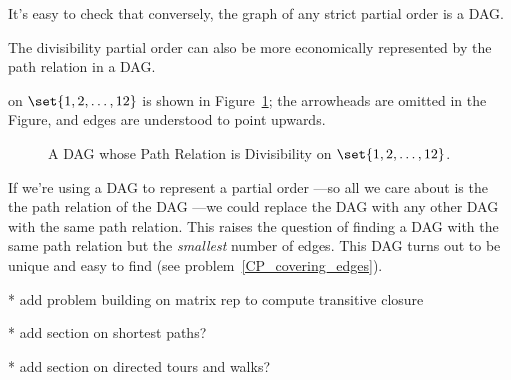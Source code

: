 It's easy to check that conversely, the graph of any strict partial
order is a DAG.

The divisibility partial order can also be more economically represented by
the path relation in a DAG.   on $\set{1,2,\dots,12}$ is shown in
Figure~\ref{fig:divisibility-DAG}; the arrowheads are omitted in the
Figure, and edges are understood to point upwards.

\begin{figure}[h]
\begin{center}

\end{center}
\caption{A DAG whose Path Relation is Divisibility on $\set{1,2,\dots,12}$.}
\label{fig:divisibility-DAG}
\end{figure}

If we're using a DAG to represent a partial order ---so all we care
about is the the path relation of the DAG ---we could replace the DAG
with any other DAG with the same path relation.  This raises the
question of finding a DAG with the same path relation but the
\emph{smallest} number of edges.  This DAG turns out to be unique and
easy to find (see problem~\ref{CP_covering_edges}).

\begin{problems}
\practiceproblems
{}

\classproblems
{}

\homeworkproblems
{}
\end{problems}

\begin{staffnotes}
* add problem building on matrix rep to compute transitive closure

* add section on shortest paths?

* add section on directed tours and walks?
\end{staffnotes}



\endinput

